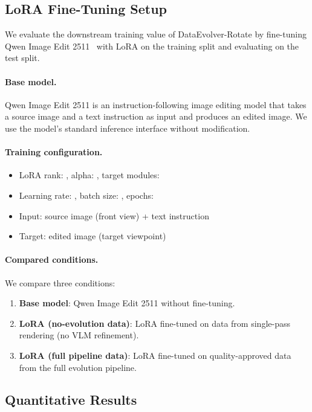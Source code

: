 \subsection{LoRA Fine-Tuning Setup}
\label{sec:exp:lora_setup}

We evaluate the downstream training value of DataEvolver-Rotate by fine-tuning
Qwen Image Edit 2511~\cite{PLACEHOLDER_qwen_image_edit_verify} with LoRA
on the training split and evaluating on the test split.

\paragraph{Base model.}
Qwen Image Edit 2511 is an instruction-following image editing model
that takes a source image and a text instruction as input and produces an edited image.
We use the model's standard inference interface without modification.

\paragraph{Training configuration.}
\begin{itemize}
  \item LoRA rank: , alpha: , target modules: 
  \item Learning rate: , batch size: , epochs: 
  \item Input: source image (front view) + text instruction
  \item Target: edited image (target viewpoint)
\end{itemize}

\paragraph{Compared conditions.}
We compare three conditions:
\begin{enumerate}
  \item \textbf{Base model}: Qwen Image Edit 2511 without fine-tuning.
  \item \textbf{LoRA (no-evolution data)}: LoRA fine-tuned on data from
    single-pass rendering (no VLM refinement).
  \item \textbf{LoRA (full pipeline data)}: LoRA fine-tuned on quality-approved data
    from the full \dataevolver{} evolution pipeline.
\end{enumerate}


\subsection{Quantitative Results}
\label{sec:exp:quant}

